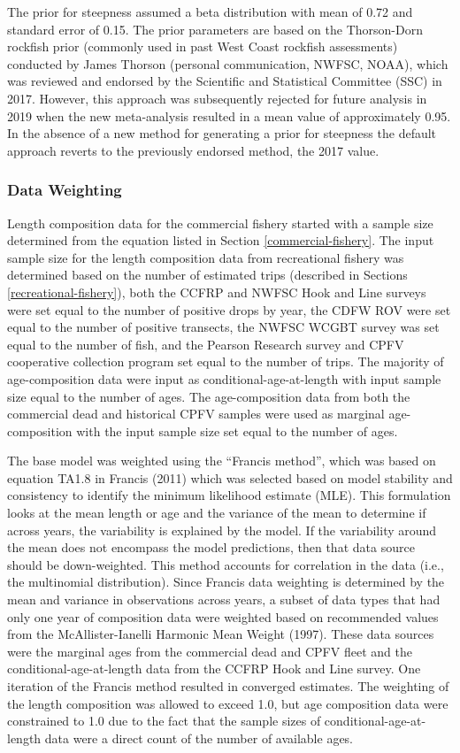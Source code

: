 \documentclass[11pt,
  english,
  letterpaper,
]{article}
\begin{document}
The prior for steepness assumed a beta distribution with mean of 0.72 and standard error of 0.15. The prior parameters are based on the Thorson-Dorn rockfish prior (commonly used in past West Coast rockfish assessments) conducted by James Thorson (personal communication, NWFSC, NOAA), which was reviewed and endorsed by the Scientific and Statistical Committee (SSC) in 2017. However, this approach was subsequently rejected for future analysis in 2019 when the new meta-analysis resulted in a mean value of approximately 0.95. In the absence of a new method for generating a prior for steepness the default approach reverts to the previously endorsed method, the 2017 value.

\hypertarget{data-weighting}{%
\subsubsection{Data Weighting}\label{data-weighting}}

Length composition data for the commercial fishery started with a sample size determined from the equation listed in Section \ref{commercial-fishery}. The input sample size for the length composition data from recreational fishery was determined based on the number of estimated trips (described in Sections \ref{recreational-fishery}), both the CCFRP and NWFSC Hook and Line surveys were set equal to the number of positive drops by year, the CDFW ROV were set equal to the number of positive transects, the NWFSC WCGBT survey was set equal to the number of fish, and the Pearson Research survey and CPFV cooperative collection program set equal to the number of trips. The majority of age-composition data were input as conditional-age-at-length with input sample size equal to the number of ages. The age-composition data from both the commercial dead and historical CPFV samples were used as marginal age-composition with the input sample size set equal to the number of ages.

The base model was weighted using the ``Francis method'', which was based on equation TA1.8 in Francis (2011) which was selected based on model stability and consistency to identify the minimum likelihood estimate (MLE). This formulation looks at the mean length or age and the variance of the mean to determine if across years, the variability is explained by the model. If the variability around the mean does not encompass the model predictions, then that data source should be down-weighted. This method accounts for correlation in the data (i.e., the multinomial distribution). Since Francis data weighting is determined by the mean and variance in observations across years, a subset of data types that had only one year of composition data were weighted based on recommended values from the McAllister-Ianelli Harmonic Mean Weight (1997). These data sources were the marginal ages from the commercial dead and CPFV fleet and the conditional-age-at-length data from the CCFRP Hook and Line survey. One iteration of the Francis method resulted in converged estimates. The weighting of the length composition was allowed to exceed 1.0, but age composition data were constrained to 1.0 due to the fact that the sample sizes of conditional-age-at-length data were a direct count of the number of available ages.
\end{document}
